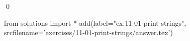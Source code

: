
\begin{ex}
  \label{ex:11-01-print-strings}
  
  \qed
\end{ex}
\begin{python0}
from solutions import *
add(label="ex:11-01-print-strings",
    srcfilename='exercises/11-01-print-strings/answer.tex')
\end{python0}
